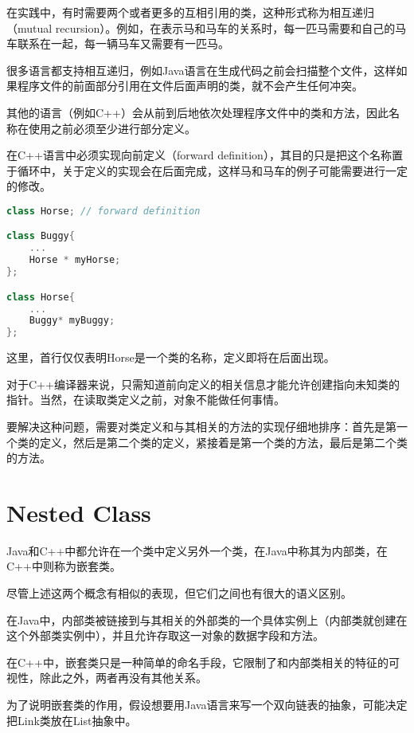 在实践中，有时需要两个或者更多的互相引用的类，这种形式称为相互递归（mutual recursion）。例如，在表示马和马车的关系时，每一匹马需要和自己的马车联系在一起，每一辆马车又需要有一匹马。

很多语言都支持相互递归，例如Java语言在生成代码之前会扫描整个文件，这样如果程序文件的前面部分引用在文件后面声明的类，就不会产生任何冲突。

其他的语言（例如C++）会从前到后地依次处理程序文件中的类和方法，因此名称在使用之前必须至少进行部分定义。


在C++语言中必须实现向前定义（forward definition），其目的只是把这个名称置于循环中，关于定义的实现会在后面完成，这样马和马车的例子可能需要进行一定的修改。

\begin{lstlisting}[language=C++]
class Horse; // forward definition

class Buggy{
	...
	Horse * myHorse;
};

class Horse{
	...
	Buggy* myBuggy;
};
\end{lstlisting}

这里，首行仅仅表明Horse是一个类的名称，定义即将在后面出现。

对于C++编译器来说，只需知道前向定义的相关信息才能允许创建指向未知类的指针。当然，在读取类定义之前，对象不能做任何事情。

要解决这种问题，需要对类定义和与其相关的方法的实现仔细地排序：首先是第一个类的定义，然后是第二个类的定义，紧接着是第一个类的方法，最后是第二个类的方法。

\section{Nested Class}

Java和C++中都允许在一个类中定义另外一个类，在Java中称其为内部类，在C++中则称为嵌套类。


尽管上述这两个概念有相似的表现，但它们之间也有很大的语义区别。

在Java中，内部类被链接到与其相关的外部类的一个具体实例上（内部类就创建在这个外部类实例中），并且允许存取这一对象的数据字段和方法。

在C++中，嵌套类只是一种简单的命名手段，它限制了和内部类相关的特征的可视性，除此之外，两者再没有其他关系。

为了说明嵌套类的作用，假设想要用Java语言来写一个双向链表的抽象，可能决定把Link类放在List抽象中。



